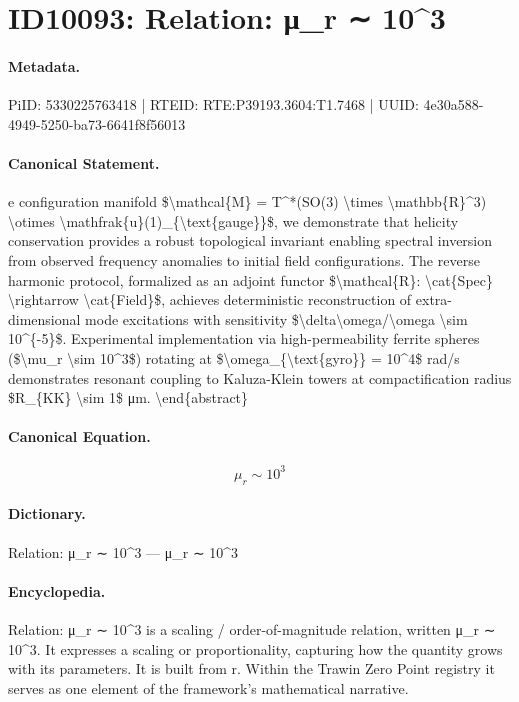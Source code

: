 \section*{ID10093: Relation: μ\_r ∼ 10\textasciicircum{}3}
\paragraph{Metadata.}
PiID: 5330225763418 | RTEID: RTE:P39193.3604:T1.7468 | UUID: 4e30a588-4949-5250-ba73-6641f8f56013

\paragraph{Canonical Statement.}
e configuration manifold \$\textbackslash{}mathcal\{M\} = T\textasciicircum{}*(SO(3) \textbackslash{}times \textbackslash{}mathbb\{R\}\textasciicircum{}3) \textbackslash{}otimes \textbackslash{}mathfrak\{u\}(1)\_\{\textbackslash{}text\{gauge\}\}\$, we demonstrate that helicity conservation provides a robust topological invariant enabling spectral inversion from observed frequency anomalies to initial field configurations. The reverse harmonic protocol, formalized as an adjoint functor \$\textbackslash{}mathcal\{R\}: \textbackslash{}cat\{Spec\} \textbackslash{}rightarrow \textbackslash{}cat\{Field\}\$, achieves deterministic reconstruction of extra-dimensional mode excitations with sensitivity \$\textbackslash{}delta\textbackslash{}omega/\textbackslash{}omega \textbackslash{}sim 10\textasciicircum{}\{-5\}\$. Experimental implementation via high-permeability ferrite spheres (\$\textbackslash{}mu\_r \textbackslash{}sim 10\textasciicircum{}3\$) rotating at \$\textbackslash{}omega\_\{\textbackslash{}text\{gyro\}\} = 10\textasciicircum{}4\$ rad/s demonstrates resonant coupling to Kaluza-Klein towers at compactification radius \$R\_\{KK\} \textbackslash{}sim 1\$ μm. \textbackslash{}end\{abstract\}

\paragraph{Canonical Equation.}
\[
\mu_r \sim 10^3
\]

\paragraph{Dictionary.}
Relation: μ\_r ∼ 10\textasciicircum{}3 — μ\_r ∼ 10\textasciicircum{}3

\paragraph{Encyclopedia.}
Relation: μ\_r ∼ 10\textasciicircum{}3 is a scaling / order-of-magnitude relation, written μ\_r ∼ 10\textasciicircum{}3. It expresses a scaling or proportionality, capturing how the quantity grows with its parameters. It is built from r. Within the Trawin Zero Point registry it serves as one element of the framework's mathematical narrative.
